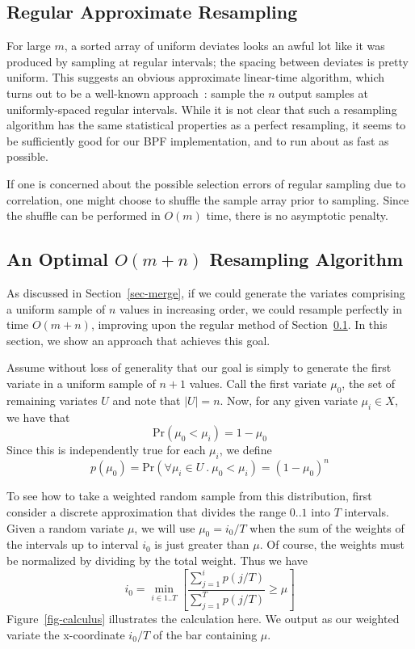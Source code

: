 \documentclass[12pt]{article}
\newcommand{\Prob}{\text{Pr}}
\begin{document}
\subsection{Regular Approximate Resampling}\label{sec-regular}

  For large $m$, a sorted array of uniform deviates looks an
  awful lot like it was produced by sampling at regular
  intervals; the spacing between deviates is pretty uniform.
  This suggests an obvious approximate linear-time
  algorithm, which turns out to be a well-known approach~\cite{kitagawa}:
  sample the $n$ output samples at uniformly-spaced regular
  intervals.  While it is not clear that such a resampling
  algorithm has the same statistical properties as a perfect
  resampling, it seems to be sufficiently good for our BPF
  implementation, and to run about as fast as possible.

  If one is concerned about the possible selection errors of
  regular sampling due to correlation, one might choose to
  shuffle the sample array prior to sampling.  Since the
  shuffle can be performed in $O(m)$ time, there is no
  asymptotic penalty.

\subsection{An Optimal $O(m + n)$ Resampling Algorithm}\label{sec-optimal}

  As discussed in Section~\ref{sec-merge}, if we could generate
  the variates comprising a uniform sample of $n$ values in
  increasing order, we could resample perfectly in time $O(m
  + n)$, improving upon the regular method of Section~\ref{sec-regular}.  In
  this section, we show an approach that achieves this
  goal.

  Assume without loss of generality that our goal is simply
  to generate the first variate in a uniform sample of $n +
  1$ values.  Call the first variate $\mu_0$, the set of
  remaining variates $U$ and note that $|U|=n$.  Now, for
  any given variate $\mu_i \in X$, we have that
    $$ \Prob(\mu_0 < \mu_i) = 1 - \mu_0 $$
  Since this is independently true for each $\mu_i$, we define
    $$p(\mu_0) = \Prob(\forall \mu_i \in U ~.~ \mu_0 < \mu_i) = (1 - \mu_0)^n$$
  
  To see how to take a weighted random sample from this
  distribution, first consider a discrete approximation that
  divides the range $0..1$ into $T$ intervals.  Given a
  random variate $\mu$, we will use $\mu_0=i_0/T$ when
  the sum of the weights of the intervals up to interval $i_0$
  is just greater than $\mu$.  Of course, the weights must be
  normalized by dividing by the total weight.  Thus we have
    $$i_0=\min_{i\in1..T}\left[{\frac{\sum_{j=1}^{i}{p(j/T)}}
                         {\sum_{j=1}^{T}{p(j/T)}} \ge \mu}\right]$$
  Figure~\ref{fig-calculus} illustrates the calculation
  here.  We output as our weighted variate the
  x-coordinate $i_0/T$ of the bar containing $\mu$.
\end{document}
